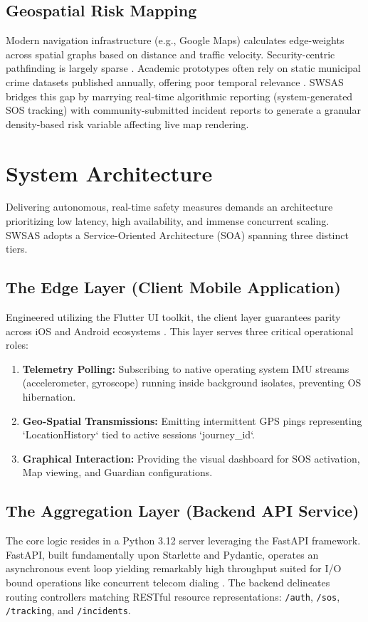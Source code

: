 \documentclass[10pt,journal,compsoc]{IEEEtran}
\begin{document}
\subsection{Geospatial Risk Mapping}
Modern navigation infrastructure (e.g., Google Maps) calculates edge-weights across spatial graphs based on distance and traffic velocity. Security-centric pathfinding is largely sparse \cite{lee2021}. Academic prototypes often rely on static municipal crime datasets published annually, offering poor temporal relevance \cite{varma2020}. SWSAS bridges this gap by marrying real-time algorithmic reporting (system-generated SOS tracking) with community-submitted incident reports to generate a granular density-based risk variable affecting live map rendering.

\section{System Architecture}
Delivering autonomous, real-time safety measures demands an architecture prioritizing low latency, high availability, and immense concurrent scaling. SWSAS adopts a Service-Oriented Architecture (SOA) spanning three distinct tiers.



\subsection{The Edge Layer (Client Mobile Application)}
Engineered utilizing the Flutter UI toolkit, the client layer guarantees parity across iOS and Android ecosystems \cite{ramirez2021}. This layer serves three critical operational roles:
\begin{enumerate}
    \item \textbf{Telemetry Polling:} Subscribing to native operating system IMU streams (accelerometer, gyroscope) running inside background isolates, preventing OS hibernation.
    \item \textbf{Geo-Spatial Transmissions:} Emitting intermittent GPS pings representing `LocationHistory` tied to active sessions `journey\_id`.
    \item \textbf{Graphical Interaction:} Providing the visual dashboard for SOS activation, Map viewing, and Guardian configurations.
\end{enumerate}

\subsection{The Aggregation Layer (Backend API Service)}
The core logic resides in a Python 3.12 server leveraging the FastAPI framework. FastAPI, built fundamentally upon Starlette and Pydantic, operates an asynchronous event loop yielding remarkably high throughput suited for I/O bound operations like concurrent telecom dialing \cite{ramirez2021}. The backend delineates routing controllers matching RESTful resource representations: \texttt{/auth}, \texttt{/sos}, \texttt{/tracking}, and \texttt{/incidents}. 
\end{document}
